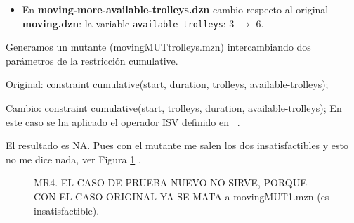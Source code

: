 \begin{itemize}
    \item[(1)] En \textbf{moving-more-available-trolleys.dzn} cambio respecto al original \textbf{moving.dzn}:
    la variable \texttt{available-trolleys}: 3 $\rightarrow$ 6.
\end{itemize}    

Generamos un mutante (movingMUTtrolleys.mzn) intercambiando dos parámetros de la restricción cumulative.

Original: constraint cumulative(start, duration, trolleys, available-trolleys);

Cambio: constraint cumulative(start, trolleys, duration, available-trolleys);
En este caso se ha aplicado el operador ISV definido en ~\cite{puig2010equivalencias}.

El resultado es NA. 
Pues con el mutante me salen los dos insatisfactibles y esto no me dice nada, ver Figura \ref{fig:more-trolleys} .

\begin{figure}[h]
\begin{center}
\begin{minipage}{0.49\linewidth}
\end{minipage}
\begin{minipage}{0.49\linewidth}
\end{minipage}
\caption{MR4. EL CASO DE PRUEBA NUEVO NO SIRVE, PORQUE CON EL CASO ORIGINAL YA SE MATA a movingMUT1.mzn (es insatisfactible).}
\label{fig:more-trolleys}
\end{center}
\end{figure}

